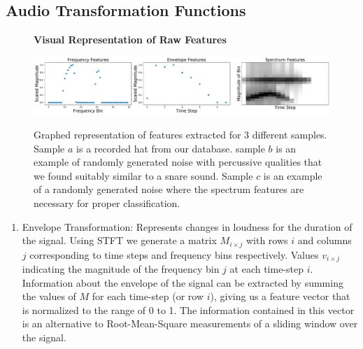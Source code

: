 \documentclass[runningheads,a4paper]{llncs}
\begin{document}
\begin{appendices}
\chapter{Audio Transformation Functions}
\label{appendix:trans_funcitons}
\begin{figure}[tbp]
\centering
\textbf{Visual Representation of Raw Features}\par\medskip
    { \includegraphics[width=1\columnwidth]{images/ff3.pdf}}
\caption{Graphed representation of features extracted for 3 different samples. Sample $a$ is a recorded hat from our database. sample $b$ is an example of randomly generated noise with percussive qualities that we found suitably similar to a snare sound. Sample $c$ is an example of a randomly generated noise where the spectrum features are necessary for proper classification.}
\label{fig:stackspectrums}
\end{figure}
\begin{enumerate}
\item Envelope Transformation: Represents changes in loudness for the duration of the signal. Using STFT we generate a matrix $M_{i \times j}$ with rows $i$ and columns $j$ corresponding to time steps and frequency bins respectively. Values $v_{i \times j}$ indicating the magnitude of the frequency bin $j$ at each time-step $i$. Information about the envelope of the signal can be extracted by summing the values of $M$ for each time-step (or row $i$), giving us a feature vector that is normalized to the range of 0 to 1. The information contained in this vector is an alternative to Root-Mean-Square measurements of a sliding window over the signal.

\end{enumerate}
\end{appendices}
\end{document}
